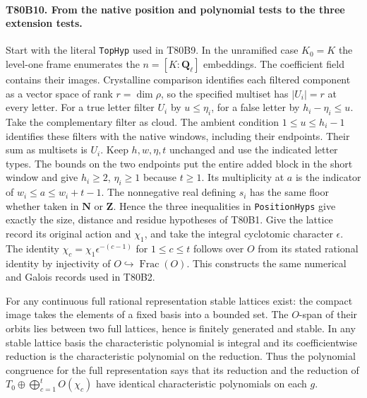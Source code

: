 \paragraph{T80B10. From the native position and polynomial tests to the three extension tests.}
Start with the literal \texttt{TopHyp} used in T80B9. In the unramified
case $K_0=K$ the level-one frame enumerates the $n=[K:\mathbf Q_\ell]$
embeddings. The coefficient field contains their images. Crystalline
comparison identifies each filtered component as a vector space of rank
$r=\dim\rho$, so the specified multiset has $|U_i|=r$ at every letter.
For a true letter filter $U_i$ by $u\le\eta_i$, for a false letter
by $h_i-\eta_i\le u$. Take the complementary filter as cloud. The
ambient condition $1\le u\le h_i-1$ identifies these filters with the
native windows, including their endpoints. Their sum as multisets is
$U_i$. Keep $h,w,\eta,t$ unchanged and use the indicated letter types.
The bounds on the two endpoints put the entire added block in the
short window and give $h_i\ge2$, $\eta_i\ge1$ because $t\ge1$.
Its multiplicity at $a$ is the indicator of $w_i\le a\le w_i+t-1$.
The nonnegative real defining $s_i$ has the same floor whether taken in
$\mathbf N$ or $\mathbf Z$. Hence the three inequalities in
\texttt{PositionHyps} give exactly the size, distance and residue
hypotheses of T80B1. Give the lattice record its original action and
$\chi_1$, and take the integral cyclotomic character $\epsilon$.
The identity $\chi_c=\chi_1\epsilon^{-(c-1)}$ for $1\le c\le t$
follows over $O$ from its stated rational identity by injectivity of
$O\hookrightarrow\operatorname{Frac}(O)$. This constructs the same
numerical and Galois records used in T80B2.

For any continuous full rational representation stable lattices exist:
the compact image takes the elements of a fixed basis into a bounded
set. The $O$-span of their orbits lies between two full lattices,
hence is finitely generated and stable. In any stable lattice basis
the characteristic polynomial is integral and its coefficientwise
reduction is the characteristic polynomial on the reduction. Thus
the polynomial congruence for the full representation says that its
reduction and the reduction of $T_0\oplus\bigoplus_{c=1}^tO(\chi_c)$
have identical characteristic polynomials on each $g$.


